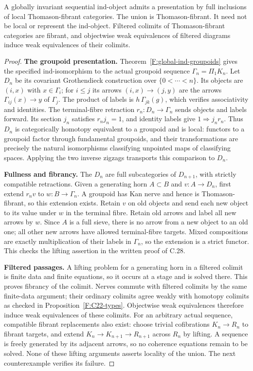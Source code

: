 \begin{proposition}
\label{F:C28-presentations}
A globally invariant sequential ind-object admits a presentation by
full inclusions of local Thomason-fibrant categories. The union is
Thomason-fibrant. It need not be local or represent the ind-object.
Filtered colimits of Thomason-fibrant categories are fibrant, and
objectwise weak equivalences of filtered diagrams induce weak
equivalences of their colimits.
\end{proposition}
\begin{proof}
\textbf{The groupoid presentation.} Theorem~\ref{F:global-ind-groupoids}
gives the specified ind-isomorphism to the actual groupoid sequence
$\Gamma_n=\Pi_1K_n$. Let $D_n$ be its covariant Grothendieck construction
over $\{0<\cdots<n\}$. Its objects are $(i,x)$ with $x\in\Gamma_i$;
for $i\leq j$ its arrows $(i,x)\to(j,y)$ are the arrows
$\Gamma_{ij}(x)\to y$ of $\Gamma_j$. The product of labels is
$h\,\Gamma_{jk}(g)$, which verifies associativity and identities.
The terminal-fibre retraction $r_n:D_n\to\Gamma_n$ sends objects and
labels forward. Its section $j_n$ satisfies $r_nj_n=1$, and identity
labels give $1\Rightarrow j_nr_n$. Thus $D_n$ is categorically homotopy
equivalent to a groupoid and is local: functors to a groupoid factor
through fundamental groupoids, and their transformations are precisely
the natural isomorphisms classifying unpointed maps of classifying
spaces. Applying the two inverse zigzags transports this comparison to
$D_n$.

\textbf{Fullness and fibrancy.} The $D_n$ are full subcategories of
$D_{n+1}$, with strictly compatible retractions. Given a generating
horn $A\subset B$ and $v:A\to D_n$, first extend $r_nv$ to
$w:B\to\Gamma_n$. A groupoid has Kan nerve and hence is
Thomason-fibrant, so this extension exists. Retain $v$ on old objects
and send each new object to its value under $w$ in the terminal fibre.
Retain old arrows and label all new arrows by $w$. Since $A$ is a full
sieve, there is no arrow from a new object to an old one; all other
new arrows have allowed terminal-fibre targets. Mixed compositions
are exactly multiplication of their labels in $\Gamma_n$, so the
extension is a strict functor. This checks the lifting assertion in
the written proof of C.28.

\textbf{Filtered passages.} A lifting problem for a generating horn
in a filtered colimit is finite data and finite equations, so it occurs
at a stage and is solved there. This proves fibrancy of the colimit.
Nerves commute with filtered colimits by the same finite-data argument;
their ordinary colimits agree weakly with homotopy colimits as checked
in Proposition~\ref{F:C22-types}. Objectwise weak equivalences therefore
induce weak equivalences of these colimits. For an arbitrary actual
sequence, compatible fibrant replacements also exist: choose trivial
cofibrations $K_n\to R_n$ to fibrant targets, and extend
$K_n\to K_{n+1}\to R_{n+1}$ across $R_n$ by lifting. A sequence is
freely generated by its adjacent arrows, so no coherence equations
remain to be solved. None of these lifting arguments asserts locality
of the union. The next counterexample verifies its failure.
\end{proof}

